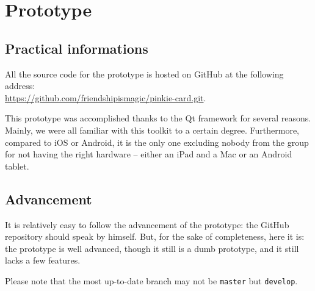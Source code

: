\documentclass[a4paper,12pt]{article}
\begin{document}
\section{Prototype}

\subsection{Practical informations}

All the source code for the prototype is hosted on GitHub at the following address: \\
\url{https://github.com/friendshipismagic/pinkie-card.git}.

This prototype was accomplished thanks to the Qt framework for several reasons. Mainly, we were all familiar with this
toolkit to a certain degree. Furthermore, compared to iOS or Android, it is the only one excluding nobody from the
group for not having the right hardware -- either an iPad and a Mac or an Android tablet.

\subsection{Advancement}

It is relatively easy to follow the advancement of the prototype: the GitHub repository should speak by himself.
But, for the sake of completeness, here it is: the prototype is well advanced, though it still is a dumb prototype,
and it still lacks a few features.

Please note that the most up-to-date branch may not be \texttt{master} but \texttt{develop}.
\end{document}
